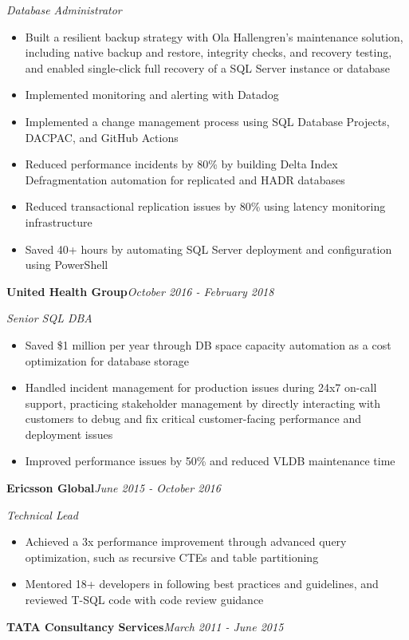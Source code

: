 \documentclass[10pt,a4paper]{article}
\begin{document}
\textit{Database Administrator}\\[-5pt]
\begin{itemize}
  \item Built a resilient backup strategy with Ola Hallengren's maintenance solution, including native backup and restore, integrity checks, and recovery testing, and enabled single-click full recovery of a SQL Server instance or database
  \item Implemented monitoring and alerting with Datadog
  \item Implemented a change management process using SQL Database Projects, DACPAC, and GitHub Actions
  \item Reduced performance incidents by 80\% by building Delta Index Defragmentation automation for replicated and HADR databases
  \item Reduced transactional replication issues by 80\% using latency monitoring infrastructure
  \item Saved 40+ hours by automating SQL Server deployment and configuration using PowerShell
\end{itemize}
\vspace{14.7pt}
\noindent\textbf{United Health Group}\hfill \textit{October 2016 - February 2018}

\textit{Senior SQL DBA}\\[-5pt]
\begin{itemize}
  \item Saved \$1 million per year through DB space capacity automation as a cost optimization for database storage
  \item Handled incident management for production issues during 24x7 on-call support, practicing stakeholder management by directly interacting with customers to debug and fix critical customer-facing performance and deployment issues
  \item Improved performance issues by 50\% and reduced VLDB maintenance time
\end{itemize}
\vspace{14.7pt}
\noindent\textbf{Ericsson Global}\hfill \textit{June 2015 - October 2016}

\textit{Technical Lead}\\[-5pt]
\begin{itemize}
  \item Achieved a 3x performance improvement through advanced query optimization, such as recursive CTEs and table partitioning
  \item Mentored 18+ developers in following best practices and guidelines, and reviewed T-SQL code with code review guidance
\end{itemize}
\vspace{14.7pt}
\noindent\textbf{TATA Consultancy Services}\hfill \textit{March 2011 - June 2015}
\end{document}

